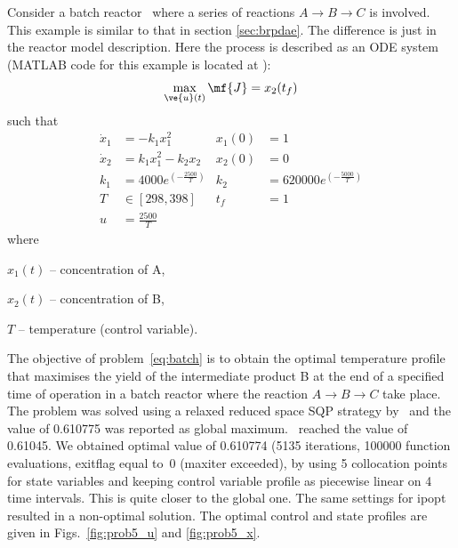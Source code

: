 Consider a batch reactor~\citep{raj01,dad95} where a series of
reactions $A \rightarrow B\rightarrow C$ is involved. This example is
similar to that in section \ref{sec:brpdae}. The difference is just in
the reactor model description. Here the process is described as an ODE
system (MATLAB code for this example is located at
):
\begin{equation}
\max_{\ve{u}(t)} \mf{J} = x_{2}(t_{f}) \label{eq:batch}
\end{equation}
such that
\begin{align*}
\dot{x}_1&=-k_{1}x_{1}^{2} &x_1(0) &= 1 \\
\dot{x}_2&=k_{1}x_{1}^{2}-k_{2}x_{2} &x_2(0) &= 0 \\
k_1 &=4000e^{(-\frac{2500}{T})} &k_2 &=620000e^{(-\frac{5000}{T})} \\
T &\in [298,398] & t_f &=1 \\
u &= \frac{2500}{T}
\end{align*}
where
\begin{description}
\item $x_{1}(t)$ -- concentration of A,
\item $x_{2}(t)$ -- concentration of B,
\item $T$ -- temperature (control variable).
\end{description}

The objective of problem~\eqref{eq:batch} is to obtain the optimal
temperature profile that maximises the yield of the intermediate
product B at the end of a specified time of operation in a batch
reactor where the reaction $A \rightarrow B \rightarrow C$ take
place. The problem was solved using a relaxed reduced space SQP
strategy by~\cite{log89} and the value of 0.610775 was reported as
global maximum.~\citeauthor{raj01} reached the value of 0.61045. We
obtained optimal value of 0.610774 (5135 iterations, 100000 function
evaluations, exitflag equal to~0 (maxiter exceeded), by using
5 collocation points for state variables and keeping control variable
profile as piecewise linear on 4 time intervals. This is quite closer
to the global one. The same settings for ipopt resulted in
a non-optimal solution. The optimal control
and state profiles are given in Figs.~\ref{fig:prob5_u} and
\ref{fig:prob5_x}.
  
